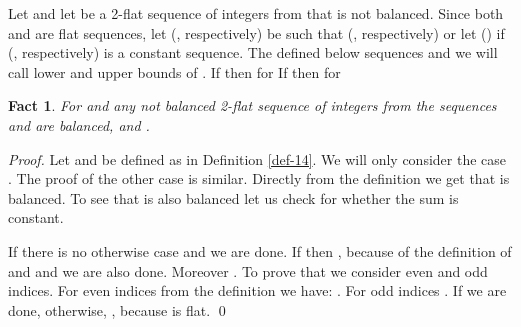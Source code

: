 \documentclass{llncs}
\newtheorem{fact}[theorem]{Fact}
\begin{document}
\begin{definition}\label{def-14}
Let  and let  be a
2-flat sequence of integers from  that is not balanced.
Since both  and 
 are 
flat sequences, let  (, respectively) be such that  
(, respectively) or let  () if 
 (, respectively) is a constant 
sequence. The defined below sequences  and  we will call 
lower and upper bounds of . If  then for   
If  then for   
\end{definition}
\begin{fact}\label{fct-19}
For  and any not balanced 2-flat sequence  of integers from  the sequences
 and  are balanced,  and .
\end{fact}
\begin{proof}
Let  and  be defined as in Definition \ref{def-14}. We will only 
consider the case . The proof of the other case is similar. Directly 
from the definition we get that  is balanced. To see that 
 is also balanced let us check for  whether the 
sum  is constant.

If  there is no otherwise case and we are done. If  then 
, because of the definition of  and  
and we are also done. Moreover . To prove that  we consider even and odd indices. For even indices 
from the definition we have: . For odd indices . If  we are done, otherwise, , because  is flat. \qed
\end{proof}
\end{document}

